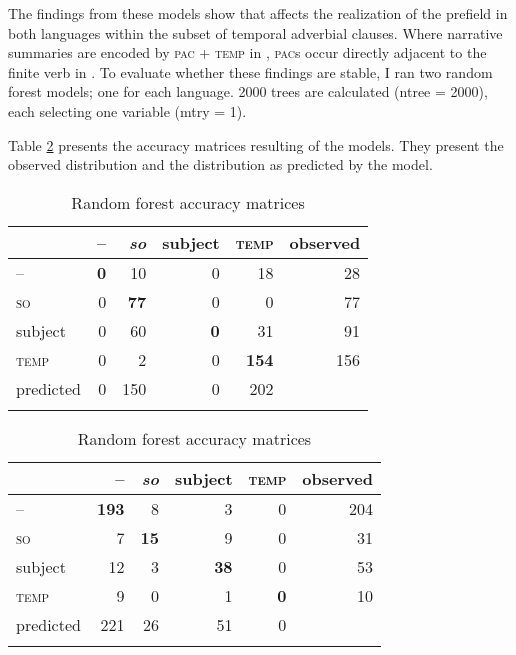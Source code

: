 \documentclass[output=paper,colorlinks,citecolor=brown]{langscibook}
\begin{document}
The findings from these models show that  affects the realization of the prefield in both languages within the subset of temporal adverbial clauses. 
Where narrative summaries are encoded by \textsc{pac} + \textsc{temp} in , \textsc{pac}s occur directly adjacent to the finite verb in . To evaluate whether these findings are stable, I ran two random forest models; one for each language. 2000 trees are calculated (ntree = 2000), each selecting one variable (mtry = 1).

Table \ref{tab-acc} presents the accuracy matrices resulting of the models. They present the observed distribution and the distribution as predicted by the model.

\begin{table}
\caption{Random forest accuracy matrices}\label{tab-acc}
\begin{subtable}[c]{0.65\linewidth}
\centering
\begin{tabularx}{\textwidth}{Xrrrrr}
\lsptoprule
& {--} & {\textit{so}}& {subject} & {\textsc{temp}}& {observed}\\
\midrule
-- & \textbf{0} & 10 & 0 & 18 & 28\\
\textsc{so} & 0 & \textbf{77} & 0 & 0& 77\\
subject & 0 & 60 & \textbf{0} & {31}& 91 \\
\textsc{temp} & 0 & 2 & 0 & \textbf{154}& 156\\
predicted & 0 & 150 & 0 & 202&\\
\lspbottomrule
\end{tabularx}
\end{subtable}

\begin{subtable}[c]{0.65\linewidth}
\centering
\begin{tabularx}{\textwidth}{Xrrrrr}
\lsptoprule
& {--} & {\textit{so}}& {subject} & {\textsc{temp}}& {observed}\\
\midrule
-- & \textbf{193} & 8 & 3 & 0 &204 \\
\textsc{so} & 7 & \textbf{15}& 9 & 0& 31\\
subject & 12 & 3 & \textbf{38} & 0&53 \\
\textsc{temp} & 9 & 0 &1 & \textbf{0}& 10\\
predicted & 221 & 26 & 51 & 0&\\
\lspbottomrule
\end{tabularx}
\end{subtable}
\end{table}
\end{document}
